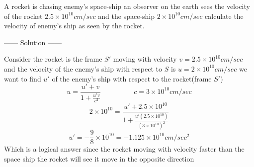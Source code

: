 \begin{example}
    A rocket is chasing enemy's space-ship an observer on the earth sees the velocity of the rocket 
    $2.5 \times 10^{10}\si{cm/sec}$ and the space-ship $2 \times 10^{10}\si{cm/sec}$ calculate the velocity of enemy's ship as seen by the rocket.
\begin{center}
    ------ \textcolor{Solution}{Solution} ------
\end{center}
Consider the rocket is the frame $S'$ moving with velocity $v=2.5 \times 10^{10}\si{cm/sec}$
and the velocity of the enemy's ship with respect to $S$ is $u=2 \times 10^{10}\si{cm/sec}$ 
we want to find $u'$ of the enemy's ship with respect to the rocket(frame $S'$)
\[
    u = \frac{u'+v}{1+\frac{u'v}{c^2}} 
    \hspace{2cm} 
    c = 3 \times 10^{10}\si{cm/sec}
\]
\[
    2 \times 10^{10} = \frac{u'+2.5 \times 10^{10}}{1+\frac{u'(2.5 \times 10^{10})}{{(3 \times 10^{10})}^2}} 
\]
\[
u' = -\frac{9}{8}\times 10^{10} = -1.125 \times 10^{10}\si{cm/sec^2}
\]
Which is a logical answer since the rocket moving with velocity faster than the space ship the rocket will see it move in the opposite direction
\end{example}
